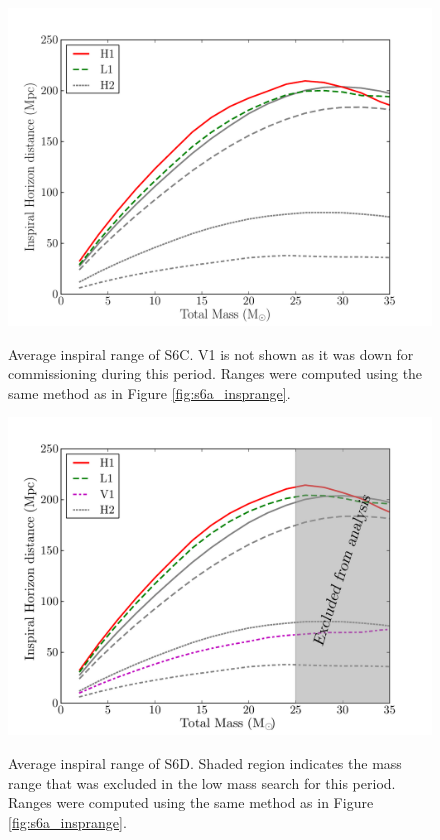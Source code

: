 \begin{figure}[p]
\begin{center}
\label{fig:s6c_insprange}
\includegraphics[width=6in]{figures/s6c_insprange.pdf}
\end{center}
\caption{Average inspiral range of S6C. V1 is not shown as it was down for commissioning during this period. Ranges were computed using the same method as in Figure \ref{fig:s6a_insprange}.}
\end{figure}

\begin{figure}[p]
\begin{center}
\label{fig:s6d_insprange}
\includegraphics[width=6in]{figures/s6d_insprange_alt.pdf}
\end{center}
\caption{Average inspiral range of S6D. Shaded region indicates the mass range that was excluded in the low mass search for this period. Ranges were computed using the same method as in Figure \ref{fig:s6a_insprange}.}
\end{figure}


